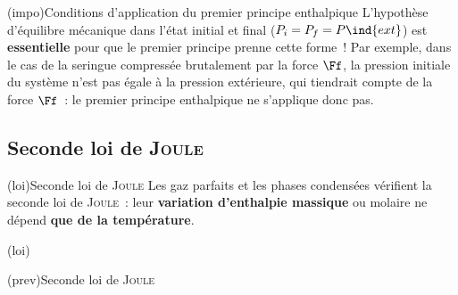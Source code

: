 \documentclass[../../main/main.tex]{subfiles}
\begin{document}
\begin{tcb*}[%
		list entry={\hspace*{-20pt}\protect\rcheck~~Conditions 1\ier{} ppe.\ enthalpique}%
	](impo){Conditions d'application du premier principe enthalpique}
	L’hypothèse d’équilibre mécanique dans l’état initial et final ($P_i = P_f =
		P\ind{ext}$) est \textbf{essentielle} pour que le premier principe prenne
	cette forme~! Par exemple, dans le cas de la seringue compressée brutalement
	par la force $\Ff$, la pression initiale du système n’est pas égale à la
	pression extérieure, qui tiendrait compte de la force $\Ff$~: le premier
	principe enthalpique ne s'applique donc pas.
\end{tcb*}

\subsection{Seconde loi de \textsc{Joule}}

\begin{tcb*}(loi){Seconde loi de \textsc{Joule}}
	Les gaz parfaits et les phases condensées vérifient la seconde loi de
	\textsc{Joule}~: leur \textbf{variation d'enthalpie massique} ou molaire
	ne dépend \textbf{que de la température}.
	\smallbreak
	\begin{isd}[sidebyside align=top, interior hidden](loi)
		\psw{%
			\[
				\boxed{h = h(T)}
			\]
		}%
		\vspace{-15pt}
		\tcblower
		\psw{%
			\[
				\boxed{H_m = \frac{D+2}{2}RT}
			\]
		}%
		\vspace{-15pt}
	\end{isd}
\end{tcb*}

\begin{tcb*}[sidebyside](prev){Seconde loi de \textsc{Joule}}
	\vspace{-15pt}
	\tcblower
	\vspace{-15pt}
\end{tcb*}
\end{document}

